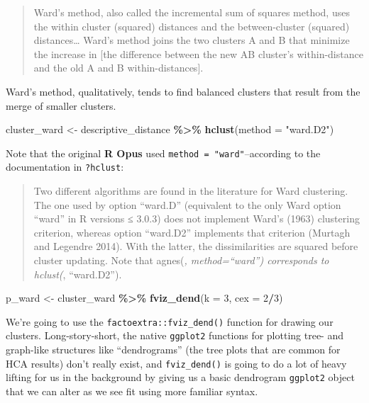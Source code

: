 \documentclass[
]{book}
\newenvironment{Shaded}{\begin{snugshade}}{\end{snugshade}}
\newcommand{\AttributeTok}[1]{\textcolor[rgb]{0.13,0.29,0.53}{#1}}
\newcommand{\DecValTok}[1]{\textcolor[rgb]{0.00,0.00,0.81}{#1}}
\newcommand{\FunctionTok}[1]{\textcolor[rgb]{0.13,0.29,0.53}{\textbf{#1}}}
\newcommand{\NormalTok}[1]{#1}
\newcommand{\OtherTok}[1]{\textcolor[rgb]{0.56,0.35,0.01}{#1}}
\newcommand{\SpecialCharTok}[1]{\textcolor[rgb]{0.81,0.36,0.00}{\textbf{#1}}}
\newcommand{\StringTok}[1]{\textcolor[rgb]{0.31,0.60,0.02}{#1}}
\begin{document}
\begin{quote}
Ward's method, also called the incremental sum of squares method, uses the within cluster (squared) distances and the between-cluster (squared) distances\ldots{} Ward's method joins the two clusters A and B that minimize the increase in {[}the difference between the new AB cluster's within-distance and the old A and B within-distances{]}.
\end{quote}

Ward's method, qualitatively, tends to find balanced clusters that result from the merge of smaller clusters.

\begin{Shaded}
\begin{Highlighting}[]
\NormalTok{cluster\_ward }\OtherTok{\textless{}{-}}
\NormalTok{  descriptive\_distance }\SpecialCharTok{\%\textgreater{}\%}
  \FunctionTok{hclust}\NormalTok{(}\AttributeTok{method =} \StringTok{"ward.D2"}\NormalTok{)}
\end{Highlighting}
\end{Shaded}

Note that the original \textbf{R Opus} used \texttt{method\ =\ "ward"}--according to the documentation in \texttt{?hclust}:

\begin{quote}
Two different algorithms are found in the literature for Ward clustering. The one used by option ``ward.D'' (equivalent to the only Ward option ``ward'' in R versions ≤ 3.0.3) does not implement Ward's (1963) clustering criterion, whereas option ``ward.D2'' implements that criterion (Murtagh and Legendre 2014). With the latter, the dissimilarities are squared before cluster updating. Note that agnes(\emph{, method=``ward'') corresponds to hclust(}, ``ward.D2'').
\end{quote}

\begin{Shaded}
\begin{Highlighting}[]
\NormalTok{p\_ward }\OtherTok{\textless{}{-}} 
\NormalTok{  cluster\_ward }\SpecialCharTok{\%\textgreater{}\%}
  \FunctionTok{fviz\_dend}\NormalTok{(}\AttributeTok{k =} \DecValTok{3}\NormalTok{, }\AttributeTok{cex =} \DecValTok{2}\SpecialCharTok{/}\DecValTok{3}\NormalTok{)}
\end{Highlighting}
\end{Shaded}

We're going to use the \texttt{factoextra::fviz\_dend()} function for drawing our clusters. Long-story-short, the native \texttt{ggplot2} functions for plotting tree- and graph-like structures like ``dendrograms'' (the tree plots that are common for HCA results) don't really exist, and \texttt{fviz\_dend()} is going to do a lot of heavy lifting for us in the background by giving us a basic dendrogram \texttt{ggplot2} object that we can alter as we see fit using more familiar syntax.
\end{document}

